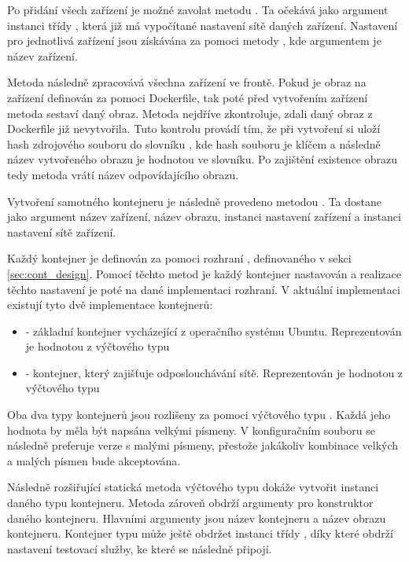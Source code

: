 Po přidání všech zařízení je možné zavolat metodu . Ta očekává jako argument instanci třídy , která již má vypočítané nastavení sítě daných zařízení. Nastavení pro jednotlivá zařízení jsou získávána za pomoci metody , kde argumentem je název zařízení. 

Metoda  následně zpracovává všechna zařízení ve frontě. Pokud je obraz na zařízení definován za pomoci Dockerfile, tak poté před vytvořením zařízení metoda  sestaví daný obraz. Metoda nejdříve zkontroluje, zdali daný obraz z Dockerfile již nevytvořila. Tuto kontrolu provádí tím, že při vytvoření si uloží hash zdrojového souboru do slovníku , kde hash souboru je klíčem a následně název vytvořeného obrazu je hodnotou ve slovníku. Po zajištění existence obrazu tedy metoda  vrátí název odpovídajícího obrazu. 

Vytvoření samotného kontejneru je následně provedeno metodou . Ta dostane jako argument název zařízení, název obrazu, instanci nastavení zařízení a instanci nastavení sítě zařízení. 

Každý kontejner je definován za pomoci rozhraní , definovaného v sekci \ref{sec:cont_design}. Pomocí těchto metod je každý kontejner nastavován a realizace těchto nastavení je poté na dané implementaci rozhraní. V aktuální implementaci existují tyto dvě implementace kontejnerů: 

\begin{itemize}
    \item {} - základní kontejner vycházející z operačního systému Ubuntu. Reprezentován je hodnotou z výčtového typu  
    \item {} - kontejner, který zajišťuje odposlouchávání sítě. Reprezentován je hodnotou z výčtového typu 
\end{itemize}

Oba dva typy kontejnerů jsou rozlišeny za pomoci výčtového typu . Každá jeho hodnota by měla být napsána velkými písmeny. V konfiguračním souboru se následně preferuje verze s malými písmeny, přestože jakákoliv kombinace velkých a malých písmen bude akceptována. 

Následně rozšiřující statická metoda výčtového typu  dokáže vytvořit instanci daného typu kontejneru. Metoda zároveň obdrží argumenty pro konstruktor daného kontejneru. Hlavními argumenty jsou název kontejneru a název obrazu kontejneru. Kontejner typu  může ještě obdržet instanci třídy , díky které obdrží nastavení testovací služby, ke které se následně připojí. 

